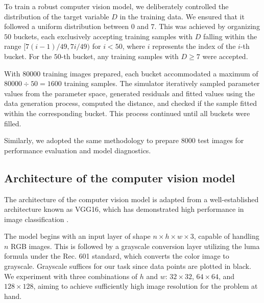 \documentclass[]{interact}
\theoremstyle{plain}%
\theoremstyle{definition}
\theoremstyle{remark}
\begin{document}
To train a robust computer vision model, we deliberately controlled the
distribution of the target variable \(D\) in the training data. We
ensured that it followed a uniform distribution between \(0\) and \(7\).
This was achieved by organizing \(50\) buckets, each exclusively
accepting training samples with \(D\) falling within the range
\([7(i - 1)/49, 7i/49)\) for \(i < 50\), where \(i\) represents the
index of the \(i\)-th bucket. For the \(50\)-th bucket, any training
samples with \(D \geq 7\) were accepted.

With 80000 training images prepared, each bucket accommodated a maximum
of \(80000 \div 50 = 1600\) training samples. The simulator iteratively
sampled parameter values from the parameter space, generated residuals
and fitted values using the data generation process, computed the
distance, and checked if the sample fitted within the corresponding
bucket. This process continued until all buckets were filled.

Similarly, we adopted the same methodology to prepare 8000 test images
for performance evaluation and model diagnostics.

\hypertarget{architecture-of-the-computer-vision-model}{%
\subsection{Architecture of the computer vision
model}\label{architecture-of-the-computer-vision-model}}

The architecture of the computer vision model is adapted from a
well-established architecture known as VGG16, which has demonstrated
high performance in image classification \citep{simonyan2014very}.

The model begins with an input layer of shape
\(n \times h \times w \times 3\), capable of handling \(n\) RGB images.
This is followed by a grayscale conversion layer utilizing the luma
formula under the Rec. 601 standard, which converts the color image to
grayscale. Grayscale suffices for our task since data points are plotted
in black. We experiment with three combinations of \(h\) and \(w\):
\(32 \times 32\), \(64 \times 64\), and \(128 \times 128\), aiming to
achieve sufficiently high image resolution for the problem at hand.
\end{document}
